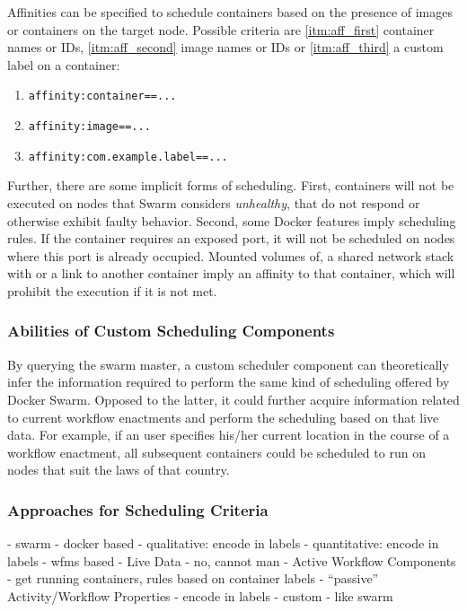     Affinities can be specified to schedule containers based on the presence of images or containers on the target node. Possible criteria are \ref{itm:aff_first} container names or \acp{ID}, \ref{itm:aff_second} image names or \acp{ID} or \ref{itm:aff_third} a custom label on a container:

    \begin{enumerate}[label=\alph*), nosep]
      \item \label{itm:aff_first} \texttt{affinity:container==...}
      \item \label{itm:aff_second} \texttt{affinity:image==...}
      \item \label{itm:aff_third} \texttt{affinity:com.example.label==...}
    \end{enumerate}

    Further, there are some implicit forms of scheduling. First, containers will not be executed on nodes that Swarm considers \emph{unhealthy}, \ie that do not respond or otherwise exhibit faulty behavior. Second, some Docker features imply scheduling rules. If the container requires an exposed port, it will not be scheduled on nodes where this port is already occupied. Mounted volumes of, a shared network stack with or a link to another container imply an affinity to that container, which will prohibit the execution if it is not met.

  \subsubsection{Abilities of Custom Scheduling Components} %
  \label{ssub:abilities_of_custom_scheduling_components}
    By querying the swarm master, a custom scheduler component can theoretically infer the information required to perform the same kind of scheduling offered by Docker Swarm. Opposed to the latter, it could further acquire information related to current workflow enactments and perform the scheduling based on that live data. For example, if an user specifies his/her current location in the course of a workflow enactment, all subsequent containers could be scheduled to run on nodes that suit the laws of that country.

  \subsubsection{Approaches for Scheduling Criteria} %
  \label{ssub:approaches_for_scheduling_criteria}
    - swarm
      - docker based
        - qualitative: encode in labels
        - quantitative: encode in labels
      - wfms based
        - Live Data
          - no, cannot man
        - Active Workflow Components
          - get running containers, rules based on container labels
        - ``passive'' Activity/Workflow Properties
          - encode in labels
    - custom
      - like swarm

